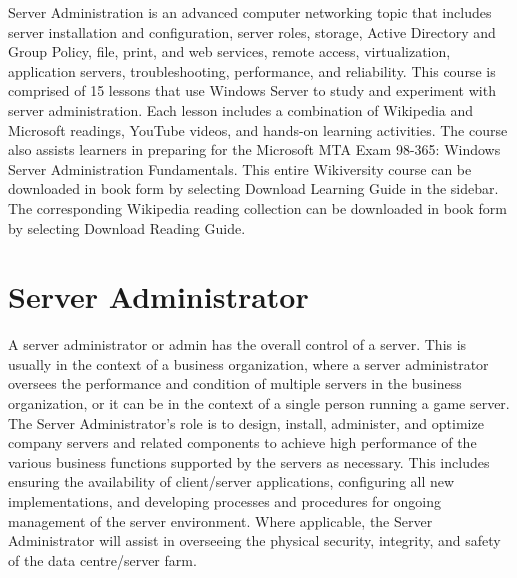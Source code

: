 Server Administration is an advanced computer networking topic that includes server installation and configuration, server roles, storage, Active Directory and Group Policy, file, print, and web services, remote access, virtualization, application servers, troubleshooting, performance, and reliability.
This course is comprised of 15 lessons that use Windows Server to study and experiment with server administration. Each lesson includes a combination of Wikipedia and Microsoft readings, YouTube videos, and hands-on learning activities. The course also assists learners in preparing for the Microsoft MTA Exam 98-365: Windows Server Administration Fundamentals.
This entire Wikiversity course can be downloaded in book form by selecting Download Learning Guide in the sidebar. The corresponding Wikipedia reading collection can be downloaded in book form by selecting Download Reading Guide.
\section{Server Administrator}
A server administrator or admin has the overall control of a server. This is usually in the context of a business organization, where a server administrator oversees the performance and condition of multiple servers in the business organization, or it can be in the context of a single person running a game server.
The Server Administrator's role is to design, install, administer, and optimize company servers and related components to achieve high performance of the various business functions supported by the servers as necessary. This includes ensuring the availability of client/server applications, configuring all new implementations, and developing processes and procedures for ongoing management of the server environment. Where applicable, the Server Administrator will assist in overseeing the physical security, integrity, and safety of the data centre/server farm.

